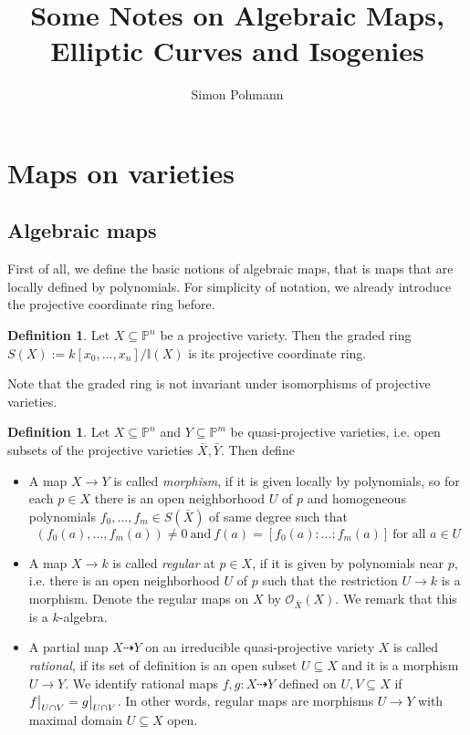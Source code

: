 \documentclass{scrartcl}
\title{Some Notes on Algebraic Maps, Elliptic Curves and Isogenies}
\author{Simon Pohmann}
\newcommand{\I}{\mathbb{I}}
\newcommand{\Proj}{\mathbb{P}}
\newcommand\restr[2]{{
    \left.\kern-\nulldelimiterspace
    #1
    \vphantom{\big|}
    \right|_{#2}
}}
\theoremstyle{definition}
\newtheorem{definition}[prop]{Definition}
\begin{document}
\maketitle

\tableofcontents

\section{Maps on varieties}

\subsection{Algebraic maps}
First of all, we define the basic notions of algebraic maps, that is maps that are locally defined by polynomials.
For simplicity of notation, we already introduce the projective coordinate ring before.
\begin{definition}
    Let $X \subseteq \Proj^n$ be a projective variety. 
    Then the graded ring $S(X) := k[x_0, ..., x_n] / \I(X)$ is its projective coordinate ring.
\end{definition}
Note that the graded ring is not invariant under isomorphisms of projective varieties.
\begin{definition}
    Let $X \subseteq \Proj^n$ and $Y \subseteq \Proj^m$ be quasi-projective varieties, i.e. open subsets of the projective varieties $\bar{X}, \bar{Y}$.
    Then define
    \begin{itemize}
        \item A map $X \to Y$ is called \emph{morphism}, if it is given locally by polynomials, so for each $p \in X$ there is an open neighborhood $U$ of $p$ and homogeneous polynomials $f_0, ..., f_m \in S(\bar{X})$ of same degree such that
        \begin{equation*}
            (f_0(a), ..., f_m(a)) \neq 0 \ \text{and} \ f(a) = [f_0(a) : ... : f_m(a)] \ \text{for all $a \in U$}
        \end{equation*}
        \item A map $X \to k$ is called \emph{regular} at $p \in X$, if it is given by polynomials near $p$, i.e. there is an open neighborhood $U$ of $p$ such that the restriction $U \to k$ is a morphism.
        Denote the regular maps on $X$ by $\mathcal{O}_{\bar{X}}(X)$.
        We remark that this is a $k$-algebra.
        \item A partial map $X \dashrightarrow Y$ on an irreducible quasi-projective variety $X$ is called \emph{rational}, if its set of definition is an open subset $U \subseteq X$ and it is a morphism $U \to Y$.
        We identify rational maps $f, g: X \dashrightarrow Y$ defined on $U, V \subseteq X$ if $\restr{f}{U \cap V} = \restr{g}{U \cap V}$.
        In other words, regular maps are morphisms $U \to Y$ with maximal domain $U \subseteq X$ open.
    \end{itemize}
\end{definition}
\end{document}
